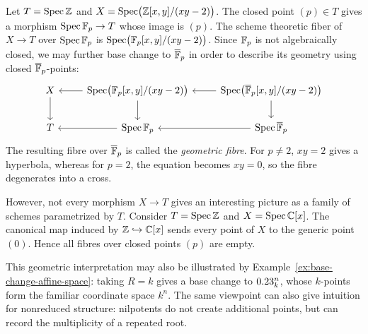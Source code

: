 \begin{example}
  Let $T = \operatorname{Spec} \mathbb{Z}$ and $X = \operatorname{Spec}\bigl(\mathbb{Z}[x, y]/(xy - 2)\bigr)$. The closed point $(p)\in T$ gives a morphism \(\operatorname{Spec} \mathbb{F}_p \to T\) whose image is \((p)\).
  The scheme theoretic fiber of \(X \to T\) over \(\operatorname{Spec} \mathbb{F}_p\) is $\operatorname{Spec}\bigl(\mathbb{F}_p[x,y]/(xy-2)\bigr)$. Since $\mathbb{F}_p$ is not algebraically closed, we may further base change to $\overline{\mathbb{F}}_p$ in order to describe its geometry using closed $\overline{\mathbb{F}}_p$-points:
    \[
        \begin{tikzcd}
            X & \Spec\bigl(\F_p[x,y]/(xy - 2)\bigr) & \Spec\bigl(\overline{\F}_p[x,y]/(xy - 2)\bigr) \\
            T & \Spec\F_p & \Spec\overline{\F}_p
            \arrow[from=1-2,to=1-1]
            \arrow[from=1-3,to=1-2]
            \arrow[from=1-1,to=2-1]
            \arrow[from=1-2,to=2-2]
            \arrow[from=1-3,to=2-3]
            \arrow[from=2-2,to=2-1]
            \arrow[from=2-3,to=2-2]
        \end{tikzcd}
    \]
    The resulting fibre over $\overline{\mathbb{F}}_p$ is called the \textit{geometric fibre}. For $p \neq 2$, $xy = 2$ gives a hyperbola, whereas for $p = 2$, the equation becomes $xy = 0$, so the fibre degenerates into a cross.
\end{example}

However, not every morphism $X \to T$ gives an interesting picture as a family of schemes parametrized by $T$. Consider $T = \operatorname{Spec}\mathbb{Z}$ and $X = \operatorname{Spec}\mathbb{C}[x]$. The canonical map induced by $\mathbb{Z} \hookrightarrow \mathbb{C}[x]$ sends every point of $X$ to the generic point $(0)$. Hence all fibres over closed points $(p)$ are empty.

This geometric interpretation may also be illustrated by Example~\ref{ex:base-change-affine-space}: taking $R = k$ gives a base change to $0.23^n_k$, whose $k$-points form the familiar coordinate space $k^n$. The same viewpoint can also give intuition for nonreduced structure: nilpotents do not create additional points, but can record the multiplicity of a repeated root.

